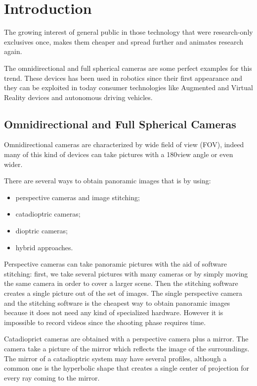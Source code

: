 \chapter{Introduction}
The growing interest of general public in those technology that were 
research-only exclusives once, makes them cheaper and spread further and
animates research again.

The omnidirectional and full spherical cameras are some perfect examples for 
this trend.
These devices has been used in robotics since their first appearance and they 
can be exploited in today consumer technologies like Augmented and Virtual 
Reality devices and autonomous driving vehicles.


\section{Omnidirectional and Full Spherical Cameras}
\label{sec:cameraclassification}
Omnidirectional cameras are characterized by wide field of view (FOV), 
indeed many of this kind
of devices can take pictures with a 180\degree view angle or even wider.

There are several ways to obtain panoramic images that is by using:
\begin{itemize}
	\item perspective cameras and image stitching;
	\item catadioptric cameras;
	\item dioptric cameras;
	\item hybrid approaches.
\end{itemize}

Perspective cameras can take panoramic pictures with the aid of 
software stitching: first, we take several pictures with many cameras or by
simply moving 
the same camera in order to cover a larger scene. Then the stitching software 
creates a single picture out of the set of images.
The single perspective camera and the stitching software is the cheapest 
way to obtain panoramic images because it does not need any kind of specialized 
hardware. However it is impossible to record videos since the shooting phase 
requires time.

Catadioprict cameras are obtained with a perspective camera plus a mirror. 
The camera take a picture of the mirror which reflects the image of the 
surroundings. The mirror of a catadioptric system may have several profiles, 
although a common one is the hyperbolic shape that creates a single center of 
projection for every ray coming to the mirror. 


